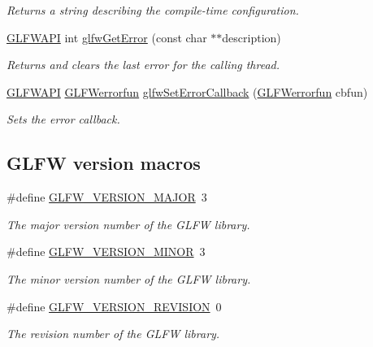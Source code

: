 \begin{DoxyCompactItemize}
\begin{DoxyCompactList}\small\item\em Returns a string describing the compile-\/time configuration. \end{DoxyCompactList}\item 
\mbox{\hyperlink{glfw3_8h_a56da5036b2cc259351ae22fd6439bb47}{G\+L\+F\+W\+A\+PI}} int \mbox{\hyperlink{group__init_gaee7bac4c7e1b2769207747c1b5ae2f9e}{glfw\+Get\+Error}} (const char $\ast$$\ast$description)
\begin{DoxyCompactList}\small\item\em Returns and clears the last error for the calling thread. \end{DoxyCompactList}\item 
\mbox{\hyperlink{glfw3_8h_a56da5036b2cc259351ae22fd6439bb47}{G\+L\+F\+W\+A\+PI}} \mbox{\hyperlink{group__init_ga6b8a2639706d5c409fc1287e8f55e928}{G\+L\+F\+Werrorfun}} \mbox{\hyperlink{group__init_ga5919096b958c47102126061fb5a6f9c3}{glfw\+Set\+Error\+Callback}} (\mbox{\hyperlink{group__init_ga6b8a2639706d5c409fc1287e8f55e928}{G\+L\+F\+Werrorfun}} cbfun)
\begin{DoxyCompactList}\small\item\em Sets the error callback. \end{DoxyCompactList}\end{DoxyCompactItemize}
\subsection*{G\+L\+FW version macros}
\begin{DoxyCompactItemize}
\item 
\#define \mbox{\hyperlink{group__init_ga6337d9ea43b22fc529b2bba066b4a576}{G\+L\+F\+W\+\_\+\+V\+E\+R\+S\+I\+O\+N\+\_\+\+M\+A\+J\+OR}}~3
\begin{DoxyCompactList}\small\item\em The major version number of the G\+L\+FW library. \end{DoxyCompactList}\item 
\#define \mbox{\hyperlink{group__init_gaf80d40f0aea7088ff337606e9c48f7a3}{G\+L\+F\+W\+\_\+\+V\+E\+R\+S\+I\+O\+N\+\_\+\+M\+I\+N\+OR}}~3
\begin{DoxyCompactList}\small\item\em The minor version number of the G\+L\+FW library. \end{DoxyCompactList}\item 
\#define \mbox{\hyperlink{group__init_gab72ae2e2035d9ea461abc3495eac0502}{G\+L\+F\+W\+\_\+\+V\+E\+R\+S\+I\+O\+N\+\_\+\+R\+E\+V\+I\+S\+I\+ON}}~0
\begin{DoxyCompactList}\small\item\em The revision number of the G\+L\+FW library. \end{DoxyCompactList}\end{DoxyCompactItemize}


